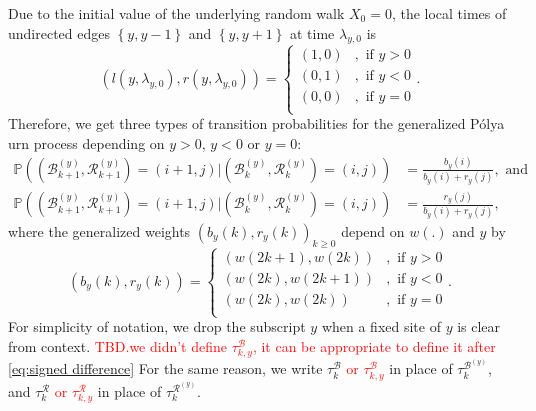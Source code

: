 \documentclass[twoside,12pt, a4paper]{article}
\numberwithin{equation}{section}
\theoremstyle{remark}
\newcommand\TBD{\textcolor{red}{TBD.}}
\newcommand{\edt}[1]{\textcolor{red}{#1}} %
\begin{document}
	
	
	
	
	Due to the initial value of the underlying random walk $X_0=0$, the local times of undirected edges $\left\{y,y-1\right\}$ and $\left\{y,y+1\right\}$ at time $\lambda_{y,0}$ is 
	\begin{equation}\label{eq: initial condition}
		\left(l(y,\lambda_{y,0}),  r( y ,\lambda_{y,0})\right) =  \begin{cases}	
			(1, 0) &,  \text{ if }  y>0 \\
			(0, 1) &,  \text{ if }  y<0 \\  
			(0, 0) &,  \text{ if }  y=0 \\
		\end{cases} 
		.\end{equation}	
	Therefore, we get three types of transition probabilities
	for the generalized P\'{o}lya urn process depending on $y>0$, $y<0$ or $y=0$:
	\begin{align*}\label{eq: transition prob for GPU}
		\mathbb{P} \left(\left(\mathcal{B}^{(y)}_{k+1},\mathcal{R}^{(y)}_{k+1} \right)=  (i+1,j) \vert (\mathcal{B}^{(y)}_{k},\mathcal{R}^{(y)}_{k}) =(i,j)  \right) &= \frac{b_y(i)}{b_y(i)+r_y(j)}, \mbox{ and}  \\
		\mathbb{P} \left((\mathcal{B}^{(y)}_{k+1},\mathcal{R}^{(y)}_{k+1})=  (i+1,j) \vert (\mathcal{B}^{(y)}_{k},\mathcal{R}^{(y)}_{k}) =(i,j)  \right) &= \frac{r_y(j)}{b_y(i)+r_y(j)},
	\end{align*} 
	where the generalized weights $(b_y(k),r_y(k))_{k\geq 0}$ depend on $w(.)$ and $y$ by  
	\begin{equation}\label{eq: generalized weights}
		(b_y(k), r_y(k)) = \begin{cases}
			(w(2k+1), w(2k)) &,  \text{ if }  y>0 \\
			(w(2k), w(2k+1)) &,  \text{ if }  y<0 \\  
			(w(2k), w(2k)) &,  \text{ if }  y=0 \\ 
		\end{cases}.
	\end{equation}
	For simplicity of notation, we drop the subscript $y$ when a fixed site of $y$ is clear from context. 
	\TBD\edt{we didn't define $\tau_{k,y}^{\mathcal{B}}$, it can be appropriate to define it after \eqref{eq:signed difference}}
	For the same reason, we write $\tau_k^{\mathcal{B}}$ \edt{or $\tau_{k,y}^{\mathcal{B}}$} in place of $\tau_k^{\mathcal{B}^{(y)}}$, and $\tau_k^{\mathcal{R}}$ \edt{or $\tau_{k,y}^{\mathcal{R}}$} in place of $\tau_k^{\mathcal{R}^{(y)}}$.
	
\end{document}
